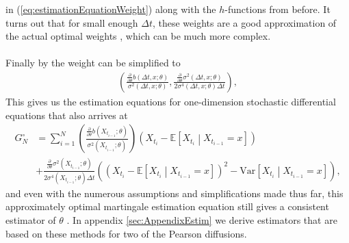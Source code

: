 in (\ref{eq:estimationEquationWeight}) along with the $h$-functions from before. It turns out that for small enough $\Delta t$, these weights are a good approximation of the actual optimal weights \cite[equation (1.32)]{StatisticalMethodsForSDE}, which can be much more complex.\\\\
Finally by \cite[lemma 1.10]{StatisticalMethodsForSDE} the weight can be simplified to
\begin{align}
    \left(\frac{\frac{\partial}{\partial\theta}b(\Delta t, x;\theta)}{\sigma^2\left(\Delta t, x; \theta\right)} , \frac{\frac{\partial}{\partial\theta}\sigma^2(\Delta t, x;\theta)}{2\sigma^4(\Delta t, x;\theta)\Delta t} \right),
\end{align}
This gives us the estimation equations for one-dimension stochastic differential equations that \cite[Example 1.11]{StatisticalMethodsForSDE} also arrives at
\begin{align}
    G_N^{\circ} &= \sum_{i = 1}^N 
    \left(
        \frac{\frac{\partial}{\partial\theta} b\left(X_{t_{i-1}};\theta\right)}{\sigma^2\left(X_{t_{i-1}};\theta\right)}
    \right) \left(X_{t_{i}} - \mathbb{E}\left[X_{t_{i}} \middle| X_{t_{i-1}} = x\right]\right) \nonumber \\
    &+ \frac{\frac{\partial}{\partial\theta}\sigma^2\left(X_{t_{i-1}}; \theta\right)}{2\sigma^4\left(X_{t_{i - 1}}; \theta\right)\Delta t}\left(\left(X_{t_{i}} - \mathbb{E}\left[X_{t_{i}} \middle| X_{t_{i-1}} = x\right]\right)^2 - \textrm{Var}\left[X_{t_{i}} \middle| X_{t_{i-1}} = x\right]\right),\label{eq:approximatelyOptimalMartingale}
\end{align}
and even with the numerous assumptions and simplifications made thus far, this approximately optimal martingale estimation equation still gives a consistent estimator of $\theta$ \cite[p.19]{StatisticalMethodsForSDE}. In appendix \ref{sec:AppendixEstim} we derive estimators that are based on these methods for two of the Pearson diffusions.
